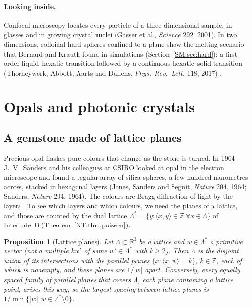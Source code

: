 \documentclass[11pt,openany]{book}
\theoremstyle{plain}
\newtheorem{proposition}[theorem]{Proposition}
\theoremstyle{definition}
\theoremstyle{remark}
\newcommand{\R}{\mathbb{R}}
\newcommand{\Z}{\mathbb{Z}}
\newcommand{\Lat}{\Lambda}             %
\newcommand{\abs}[1]{\left\lvert #1 \right\rvert}
\newcommand{\ip}[2]{\langle #1, #2\rangle}
\begin{document}
\paragraph{Looking inside.} Confocal microscopy locates every particle of a three-dimensional sample, in
glasses and in growing crystal nuclei (Gasser et al., \emph{Science} 292, 2001). In two dimensions, colloidal hard spheres confined to a plane
show the melting scenario that Bernard and Krauth found in simulations (Section~\ref{SM:sec:hard}): a
first-order liquid--hexatic transition followed by a continuous hexatic--solid transition (Thorneywork,
Abbott, Aarts and Dullens, \emph{Phys.\ Rev.\ Lett.} 118, 2017) .

\section{Opals and photonic crystals}
\label{PHYS:sec:opal}

\subsection*{A gemstone made of lattice planes}
Precious opal flashes pure colours that change as the stone is turned. In 1964 J.~V.~Sanders and his
colleagues at CSIRO looked at opal in the electron microscope and found a regular array of silica
spheres, a few hundred nanometres across, stacked in hexagonal layers (Jones, Sanders and Segnit,
\emph{Nature} 204, 1964; Sanders, \emph{Nature} 204, 1964). The colours are Bragg diffraction of light by the
layers . To see which layers and which colours, we need the planes of a lattice, and
those are counted by the dual lattice $\Lat^*=\{y:\ip xy\in\Z\ \forall x\in\Lat\}$ of
Interlude~B (Theorem~\ref{NT:thm:poisson}).

\begin{proposition}[Lattice planes]\label{PHYS:prop:planes}
Let $\Lat\subset\R^3$ be a lattice and $w\in\Lat^*$ a primitive vector (not a multiple $kw'$ of
some $w'\in\Lat^*$ with $k\ge2$). Then $\Lat$ is the disjoint union of its intersections with the parallel planes
$\{x:\ip xw=k\}$, $k\in\Z$, each of which is nonempty, and these planes are $1/\abs w$ apart. Conversely, every equally spaced family of parallel planes that covers $\Lat$, each plane containing a
lattice point, arises this way, so the largest spacing between lattice planes is
$1/\min\{\abs w:w\in\Lat^*\setminus0\}$.
\end{proposition}
\end{document}
